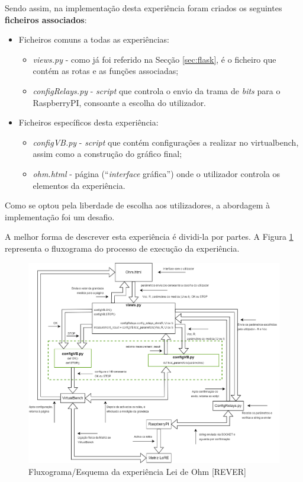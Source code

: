 Sendo assim, na implementação desta experiência foram criados os seguintes \textbf{ficheiros associados}:
\begin{itemize}
	\item Ficheiros comuns a todas as experiências:
	      \begin{itemize}
		      \item \textit{views.py} - como já foi referido na Secção \ref{sec:flask}, é o ficheiro que contém as rotas e as funções associadas;
		      \item \textit{configRelays.py} - \textit{script} que controla o envio da trama de \textit{bits} para o \gls{RaspberryPI}, consoante a escolha do utilizador.
	      \end{itemize}
	\item Ficheiros específicos desta experiência:
	      \begin{itemize}
		      \item \textit{configVB.py} - \textit{script} que contém configurações a realizar no \acrshort{virtualbench}, assim como a construção do gráfico final;
		      \item \textit{ohm.html} - página (``\textit{interface} gráfica'') onde o utilizador controla os elementos da experiência.

	      \end{itemize}
\end{itemize}

Como se optou pela liberdade de escolha aos utilizadores, a abordagem à implementação foi um desafio.

A melhor forma de descrever esta experiência é dividi-la por partes. A Figura \ref{fig:fluxohm} representa o fluxograma do processo de execução da experiência.
\begin{figure}[hbtp]
	\centering
	\includegraphics[width=1\textwidth]{figures/ohm_diagrama.drawio.png}
	\caption{Fluxograma/Esquema da experiência Lei de Ohm [REVER]}
	\label{fig:fluxohm}
\end{figure}

